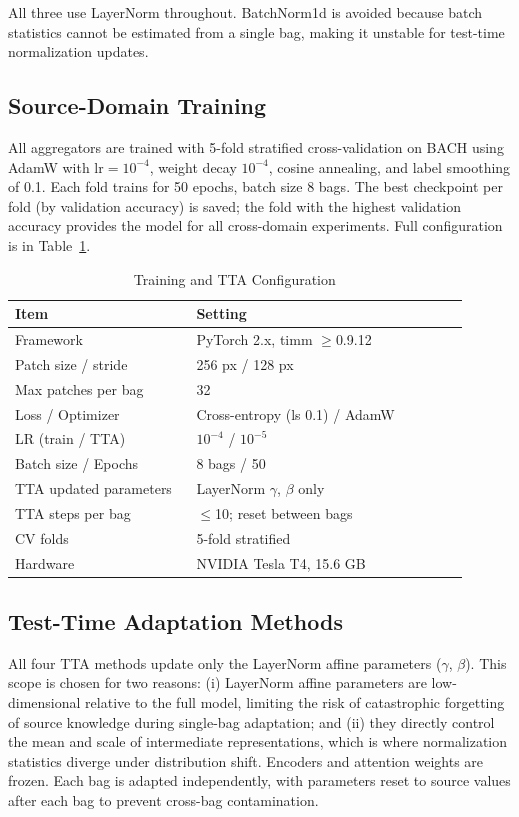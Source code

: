 \documentclass[conference]{IEEEtran}
\begin{document}
All three use LayerNorm throughout. BatchNorm1d is avoided because batch statistics cannot be estimated from a single bag, making it unstable for test-time normalization updates.

\subsection{Source-Domain Training}

All aggregators are trained with 5-fold stratified cross-validation on BACH using AdamW \cite{loshchilov2019decoupled} with $\text{lr}=10^{-4}$, weight decay $10^{-4}$, cosine annealing, and label smoothing of 0.1. Each fold trains for 50 epochs, batch size 8 bags. The best checkpoint per fold (by validation accuracy) is saved; the fold with the highest validation accuracy provides the model for all cross-domain experiments. Full configuration is in Table~\ref{tab:training}.

\begin{table}[!hbt]
\caption{Training and TTA Configuration}
\label{tab:training}
\centering
\begin{tabular}{p{0.36\linewidth} p{0.54\linewidth}}
\toprule
\textbf{Item} & \textbf{Setting} \\
\midrule
Framework & PyTorch 2.x, timm $\geq$0.9.12 \\
Patch size / stride & 256 px / 128 px \\
Max patches per bag & 32 \\
Loss / Optimizer & Cross-entropy (ls 0.1) / AdamW \\
LR (train / TTA) & $10^{-4}$ / $10^{-5}$ \\
Batch size / Epochs & 8 bags / 50 \\
TTA updated parameters & LayerNorm $\gamma$, $\beta$ only \\
TTA steps per bag & $\leq$10; reset between bags \\
CV folds & 5-fold stratified \\
Hardware & NVIDIA Tesla T4, 15.6 GB \\
\bottomrule
\end{tabular}
\end{table}

\subsection{Test-Time Adaptation Methods}

All four TTA methods update only the LayerNorm affine parameters ($\gamma$, $\beta$). This scope is chosen for two reasons: (i) LayerNorm affine parameters are low-dimensional relative to the full model, limiting the risk of catastrophic forgetting of source knowledge during single-bag adaptation; and (ii) they directly control the mean and scale of intermediate representations, which is where normalization statistics diverge under distribution shift. Encoders and attention weights are frozen. Each bag is adapted independently, with parameters reset to source values after each bag to prevent cross-bag contamination.
\end{document}
